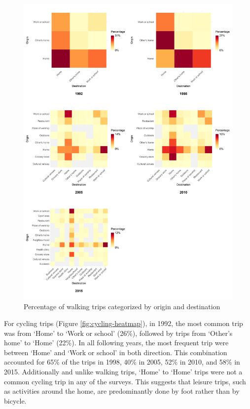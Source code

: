 \documentclass[preprint, 3p,
authoryear]{elsarticle} %
\begin{document}
\begin{figure}
\includegraphics[width=1\linewidth]{figures/walking_hm_fig} \caption{Percentage of walking trips categorized by origin and destination}\label{fig:walking-heatmap}
\end{figure}

For cycling trips (Figure \ref{fig:cycling-heatmap}), in 1992, the most
common trip was from `Home' to `Work or school' (26\%), followed by
trips from `Other's home' to `Home' (22\%). In all following years, the
most frequent trip were between `Home' and `Work or school' in both
direction. This combination accounted for 65\% of the trips in 1998,
40\% in 2005, 52\% in 2010, and 58\% in 2015. Additionally and unlike
walking trips, `Home' to `Home' trips were not a common cycling trip in
any of the surveys. This suggests that leisure trips, such as activities
around the home, are predominantly done by foot rather than by bicycle.
\end{document}
